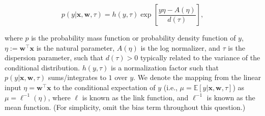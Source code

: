 \documentclass{article}
\renewcommand{\bf}[1]{\mathbf{#1}}
\begin{document}
\begin{equation} \label{eq:glm-def}
p(y|\mathbf{x}, \mathbf{w}, \tau) = h(y, \tau)\exp\left[\frac{y\eta-A(\eta)}{d(\tau)}\right],
\end{equation}

where $p$ is the probability mass function or probability density function of $y$, $\eta := \mathbf{w}^\top\mathbf{x}$ is the natural parameter, $A(\eta)$ is the log normalizer, and $\tau$ is the dispersion parameter, such that $d(\tau)>0$ typically related to the variance of the conditional distribution. $h(y, \tau)$ is a normalization factor such that $p(y|\bf{x}, \bf{w}, \tau)$ sums/integrates to $1$ over $y$. We denote the mapping from the linear input $\eta = \mathbf{w}^\top\mathbf{x}$ to the conditional expectation of $y$ (i.e., $\mu = \mathbb{E}[y|\mathbf{x}, \mathbf{w}, \tau]$) as $\mu = \ell^{-1}(\eta)$, where $\ell$ is known as the link function, and $\ell^{-1}$ is known as the mean function. (For simplicity, omit the bias term throughout this question.) %
\end{document}
